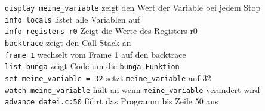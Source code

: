 \documentclass[a4paper,12pt,twoside]{article}
\begin{document}
\begin{tabbing}
	\> \verb|display meine_variable| \> zeigt den Wert der Variable bei jedem Stop \\
	\> \verb|info locals| \> listet alle Variablen auf \\
	\> \verb|info registers r0| \> Zeigt die Werte des Registers r0 \\
	\> \verb|backtrace| \> zeigt den Call Stack an \\
	\> \verb|frame 1| \> wechselt vom Frame 1 auf den backtrace \\
	\> \verb|list bunga| \> zeigt Code um die \verb|bunga-Funktion| \\
	\> \verb|set meine_variable = 32| \> setzt \verb|meine_variable| auf 32 \\
	\> \verb|watch meine_variable| \> hält an wenn \verb|meine_variable| verändert wird \\
	\> \verb|advance datei.c:50| \> führt das Programm bis Zeile 50 aus \\
\end{tabbing}
\end{document}
